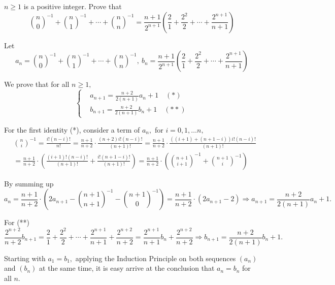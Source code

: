 \documentclass{article}
\begin{document}
\begin{problem}
    $n \ge 1$ is a positive integer. Prove that
    \[
        \binom{n}{0}^{-1} + \binom{n}{1}^{-1} + \cdots + \binom{n}{n}^{-1} = \frac{n+1}{2^{n+1}} \left(\frac{2}{1} + \frac{2^2}{2} + \cdots +\frac{2^{n+1}}{n+1}\right)
    \]
\end{problem}

\begin{soln}
    Let 
    \[
        a_n = \binom{n}{0}^{-1} + \binom{n}{1}^{-1} + \cdots + \binom{n}{n}^{-1},\ b_n = \frac{n+1}{2^{n+1}} \left(\frac{2}{1} + \frac{2^2}{2} + \cdots +\frac{2^{n+1}}{n+1}\right)
    \]

    We prove that for all $n\ge 1,$
    \[
        \begin{cases}
            &a_{n+1} = \frac{n+2}{2(n+1)} a_n + 1 \quad (*)\\
            &b_{n+1} = \frac{n+2}{2(n+1)} b_n + 1 \quad (**)
        \end{cases}
    \]

    For the first identity (*), consider a term of $a_{n},$ for $i=0,1,\ldots n,$
    \[
        \begin{aligned}
            &\binom{n}{i}^{-1} = \frac{i! (n-i)!}{n!} = \frac{n+1}{n+2} \cdot \frac{(n+2)i!(n-i)!}{(n+1)!} = \frac{n+1}{n+2} \cdot  \frac{((i+1) + (n+1-i))i!(n-i)!}{(n+1)!}\\
            &= \frac{n+1}{n+2} \cdot  \left(\frac{(i+1)!(n-i)!}{(n+1)!} + \frac{i!(n+1-i)!}{(n+1)!} \right)
            = \frac{n+1}{n+2} \cdot \left(\binom{n+1}{i+1}^{-1} + \binom{n+1}{i}^{-1}  \right)
        \end{aligned}
    \]

    By summing up
    \[
        a_n = \frac{n+1}{n+2} \cdot \left( 2a_{n+1} - \binom{n+1}{n+1}^{-1} - \binom{n+1}{0}^{-1} \right) = \frac{n+1}{n+2} \cdot (2a_{n+1} - 2)
        \Rightarrow a_{n+1} = \frac{n+2}{2(n+1)} a_n + 1.
    \]

    For (**)
    \[
        \frac{2^{n+2}}{n+2} b_{n+1} = \frac{2}{1} + \frac{2^2}{2} + \cdots + \frac{2^{n+1}}{n+1} + \frac{2^{n+2}}{n+2} = \frac{2^{n+1}}{n+1} b_{n} + \frac{2^{n+2}}{n+2}
        \Rightarrow b_{n+1} = \frac{n+2}{2(n+1)} b_n + 1.
    \]

    Starting with $a_1 = b_1,$ applying the Induction Principle on both sequences $(a_n)$ and $(b_n)$ at the same time,
    it is easy arrive at the conclusion that $a_n = b_n$ for all $n$.
\end{soln}
\end{document}
